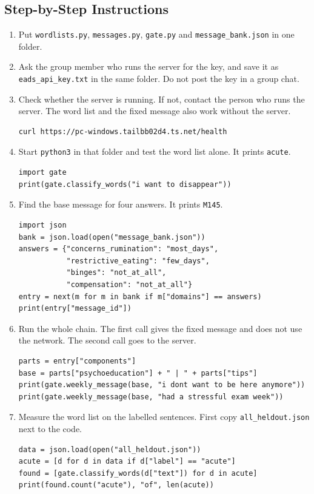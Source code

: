\documentclass[a4paper]{article}
\begin{document}
\subsection{Step-by-Step Instructions}
\begin{enumerate}
\item Put \texttt{wordlists.py}, \texttt{messages.py}, \texttt{gate.py} and \texttt{message\_bank.json} in one folder.
\item Ask the group member who runs the server for the key, and save it as \texttt{eads\_api\_key.txt} in the same folder. Do not post the key in a group chat.
\item Check whether the server is running. If not, contact the person who runs the server. The word list and the fixed message also work without the server.
\begin{verbatim}
curl https://pc-windows.tailbb02d4.ts.net/health
\end{verbatim}
\item Start \texttt{python3} in that folder and test the word list alone. It prints \texttt{acute}.
\begin{verbatim}
import gate
print(gate.classify_words("i want to disappear"))
\end{verbatim}
\item Find the base message for four answers. It prints \texttt{M145}.
\begin{verbatim}
import json
bank = json.load(open("message_bank.json"))
answers = {"concerns_rumination": "most_days",
           "restrictive_eating": "few_days",
           "binges": "not_at_all",
           "compensation": "not_at_all"}
entry = next(m for m in bank if m["domains"] == answers)
print(entry["message_id"])
\end{verbatim}
\item Run the whole chain. The first call gives the fixed message and does not use the network. The second call goes to the server.
\begin{verbatim}
parts = entry["components"]
base = parts["psychoeducation"] + " | " + parts["tips"]
print(gate.weekly_message(base, "i dont want to be here anymore"))
print(gate.weekly_message(base, "had a stressful exam week"))
\end{verbatim}
\item Measure the word list on the labelled sentences. First copy \texttt{all\_heldout.json} next to the code.
\begin{verbatim}
data = json.load(open("all_heldout.json"))
acute = [d for d in data if d["label"] == "acute"]
found = [gate.classify_words(d["text"]) for d in acute]
print(found.count("acute"), "of", len(acute))
\end{verbatim}
\end{enumerate}
\end{document}
